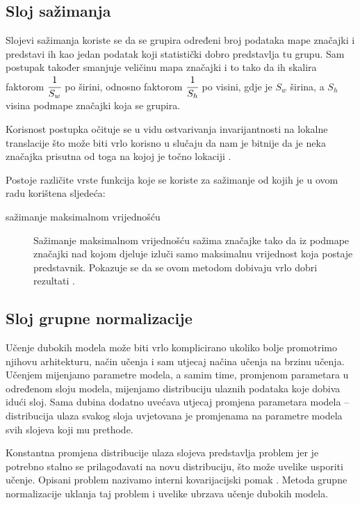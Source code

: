 \documentclass[times, utf8, diplomski, numeric]{fer}
\begin{document}
\subsection{Sloj sažimanja}
Slojevi sažimanja koriste se da se grupira određeni broj podataka mape značajki i predstavi ih kao jedan podatak koji statistički dobro predstavlja tu grupu.
Sam postupak također smanjuje veličinu mapa značajki i to tako da ih skalira faktorom $\cfrac{1}{S_w}$ po širini, odnosno faktorom $\cfrac{1}{S_h}$ po visini, gdje je $S_w$ širina, a $S_h$ visina podmape značajki koja se grupira.

Korisnost postupka očituje se u vidu ostvarivanja invarijantnosti na lokalne translacije što može biti vrlo korisno u slučaju da nam je bitnije da je neka značajka prisutna od toga na kojoj je točno lokaciji \citep{seminar:rela}.

Postoje različite vrste funkcija koje se koriste za sažimanje od kojih je u ovom radu korištena sljedeća:
\begin{description}
\item [sažimanje maksimalnom vrijednošću]
Sažimanje maksimalnom vrijednošću  sažima značajke tako da iz podmape značajki nad kojom djeluje izluči samo maksimalnu vrijednost koja postaje predstavnik.
Pokazuje se da se ovom metodom dobivaju vrlo dobri rezultati \citep{article:maxpooling_article}.
\end{description}

\subsection{Sloj grupne normalizacije }
Učenje dubokih modela može biti vrlo komplicirano ukoliko bolje promotrimo njihovu arhitekturu, način učenja i sam utjecaj načina učenja na brzinu učenja.
Učenjem mijenjamo parametre modela, a samim time, promjenom parametara u određenom sloju modela, mijenjamo distribuciju ulaznih podataka koje dobiva idući sloj.
Sama dubina dodatno uvećava utjecaj promjena parametara modela -- distribucija ulaza svakog sloja uvjetovana je promjenama na parametre modela svih slojeva koji mu prethode.

Konstantna promjena distribucije ulaza slojeva predstavlja problem jer je potrebno stalno se prilagođavati na novu distribuciju, što može uvelike usporiti učenje.
Opisani problem nazivamo interni kovarijacijski pomak . 
Metoda grupne normalizacije  uklanja taj problem i uvelike ubrzava učenje dubokih modela.
\end{document}
